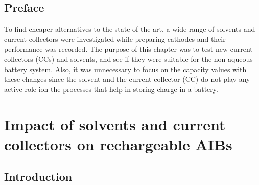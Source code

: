 \section*{Preface}
To find cheaper alternatives to the state-of-the-art, a wide range of solvents and current collectors were investigated while preparing cathodes and their performance was recorded. The purpose of this chapter was to test new current collectors (CCs) and solvents, and see if they were suitable for the non-aqueous battery system. Also, it was unnecessary to focus on the capacity values with these changes since the solvent and the current collector (CC) do not play any active role ion the processes that help in storing charge in a battery. 
\newpage

\chapter{Impact of solvents and current collectors on rechargeable AIBs} %
\label{chap7} %

\section{Introduction}

